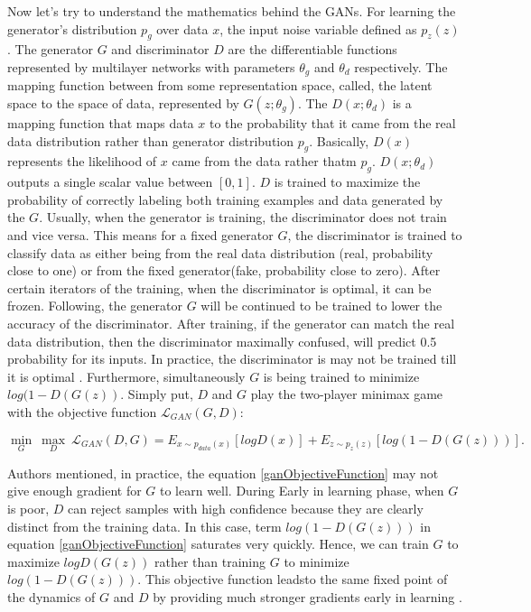 Now let's try to understand the mathematics behind the \acp{GAN}. For learning the generator’s distribution $p_g$ over data $x$, the input noise variable defined as $p_z(z)$. The generator $G$ and discriminator $D$ are the differentiable functions represented by multilayer networks with parameters $\theta_g$ and $\theta_d$ respectively. The mapping function between from some representation space, called, the latent space to the space of data, represented by $G(z; \theta_g)$. The $D(x; \theta_d)$ is a mapping function that maps data $x$ to the probability that it came from the real data distribution rather than generator distribution $p_g$. Basically, $D(x)$ represents the likelihood of $x$ came from the data rather thatm $p_g$. $D(x; \theta_d)$ outputs a single scalar value between $[0,1]$. $D$ is trained to maximize the probability of correctly labeling both training examples and data generated by the $G$. Usually, when the generator is training, the discriminator does not train and vice versa. This means for a fixed generator $G$, the discriminator is trained to classify data as either being from the real data distribution (real, probability close to one) or from the fixed generator(fake, probability close to zero). After certain iterators of the training, when the discriminator is optimal, it can be frozen. Following, the generator $G$ will be continued to be trained to lower the accuracy of the discriminator. After training, if the generator can match the real data distribution, then the discriminator maximally confused, will predict 0.5 probability for its inputs. In practice, the discriminator is may not be trained till it is optimal \cite{Creswell_2018}. Furthermore, simultaneously $G$ is being trained to minimize $log(1 - D(G(z))$. Simply put, $D$ and $G$ play the two-player minimax game with the objective function $\mathcal{L}_{GAN}(G, D)$:


\begin{equation}\label{ganObjectiveFunction}
\underset{G}{\min}\ \underset{D}{\max}\ \mathcal{L}_{GAN}(D, G) = E_{x\sim p_{data}(x)}[log D(x)] + E_{z\sim p_z(z)}[log(1 - D(G(z)))].
\end{equation}


Authors mentioned, in practice, the equation \ref{ganObjectiveFunction} may not give enough gradient for $G$ to learn well. During Early in learning phase, when $G$ is poor, $D$ can reject samples with high confidence because they are clearly distinct from the training data. In this case, term $log(1 - D(G(z)))$ in equation \ref{ganObjectiveFunction} saturates very quickly. Hence, we can train $G$ to maximize $log D(G(z))$ rather than training $G$ to minimize $log(1 - D(G(z)))$. This objective function leadsto the same fixed point of the dynamics of $G$ and $D$ by providing much stronger gradients early in learning \cite{goodfellow2014generative}.



